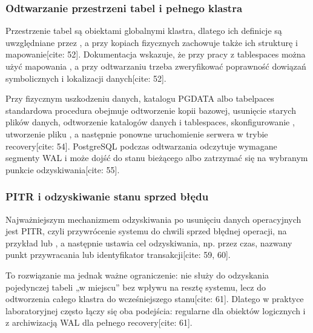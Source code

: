 \documentclass[letterpaper,10pt,polish]{sphinxmanual}
\begin{document}
\subsubsection{Odtwarzanie przestrzeni tabel i pełnego klastra}
\label{\detokenize{rozdzial_2/rozdzial_28/index:odtwarzanie-przestrzeni-tabel-i-pelnego-klastra}}
\sphinxAtStartPar
Przestrzenie tabel są obiektami globalnymi klastra, dlatego ich definicje są uwzględniane przez , a przy kopiach fizycznych  zachowuje także ich strukturę i mapowanie{[}cite: 52{]}. Dokumentacja  wskazuje, że przy pracy z tablespaces można użyć mapowania , a przy odtwarzaniu trzeba zweryfikować poprawność dowiązań symbolicznych i lokalizacji danych{[}cite: 52{]}.

\sphinxAtStartPar
Przy fizycznym uszkodzeniu danych, katalogu PGDATA albo tabelpaces standardowa procedura obejmuje odtworzenie kopii bazowej, usunięcie starych plików danych, odtworzenie katalogów danych i tablespaces, skonfigurowanie , utworzenie pliku , a następnie ponowne uruchomienie serwera w trybie recovery{[}cite: 54{]}. PostgreSQL podczas odtwarzania odczytuje wymagane segmenty WAL i może dojść do stanu bieżącego albo zatrzymać się na wybranym punkcie odzyskiwania{[}cite: 55{]}.


\subsubsection{PITR i odzyskiwanie stanu sprzed błędu}
\label{\detokenize{rozdzial_2/rozdzial_28/index:pitr-i-odzyskiwanie-stanu-sprzed-bledu}}
\sphinxAtStartPar
Najważniejszym mechanizmem odzyskiwania po usunięciu danych operacyjnych jest PITR, czyli przywrócenie systemu do chwili sprzed błędnej operacji, na przykład  lub , a następnie ustawia cel odzyskiwania, np. przez czas, nazwany punkt przywracania lub identyfikator transakcji{[}cite: 59, 60{]}.

\sphinxAtStartPar
To rozwiązanie ma jednak ważne ograniczenie: nie służy do odzyskania pojedynczej tabeli „w miejscu” bez wpływu na resztę systemu, lecz do odtworzenia całego klastra do wcześniejszego stanu{[}cite: 61{]}. Dlatego w praktyce laboratoryjnej często łączy się oba podejścia: regularne  dla obiektów logicznych i  z archiwizacją WAL dla pełnego recovery{[}cite: 61{]}.
\end{document}
